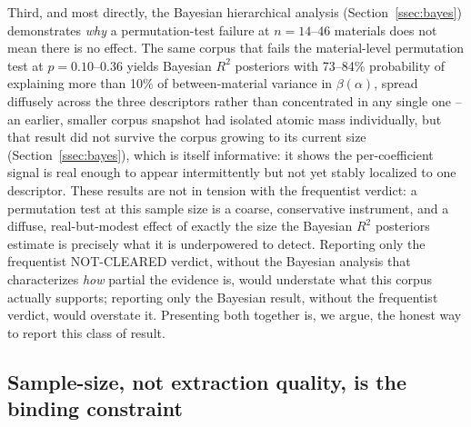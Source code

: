 \documentclass[aip,amsmath,amssymb,reprint]{revtex4-1}
\begin{document}
Third, and most directly, the Bayesian hierarchical analysis
(Section~\ref{ssec:bayes}) demonstrates \emph{why} a permutation-test
failure at $n=14$--46 materials does not mean there is no effect. The
same corpus that fails the material-level permutation test at
$p=0.10$--0.36 yields Bayesian $R^2$ posteriors with 73--84\%
probability of explaining more than 10\% of between-material variance
in $\beta(\alpha)$, spread diffusely across the three descriptors
rather than concentrated in any single one -- an earlier, smaller
corpus snapshot had isolated atomic mass individually, but that
result did not survive the corpus growing to its current size
(Section~\ref{ssec:bayes}), which is itself informative: it shows the
per-coefficient signal is real enough to appear intermittently but not
yet stably localized to one descriptor. These
results are not in tension with the frequentist verdict: a permutation
test at this sample size is a coarse, conservative instrument, and a
diffuse, real-but-modest effect of exactly the size the Bayesian $R^2$
posteriors estimate is precisely what it is underpowered to detect.
Reporting only the frequentist NOT-CLEARED
verdict, without the Bayesian analysis that characterizes \emph{how}
partial the evidence is, would understate what this corpus actually
supports; reporting only the Bayesian result, without the frequentist
verdict, would overstate it. Presenting both together is, we argue,
the honest way to report this class of result.

\subsection{Sample-size, not extraction quality, is the binding constraint}
\label{ssec:disc_samplesize}
\end{document}
